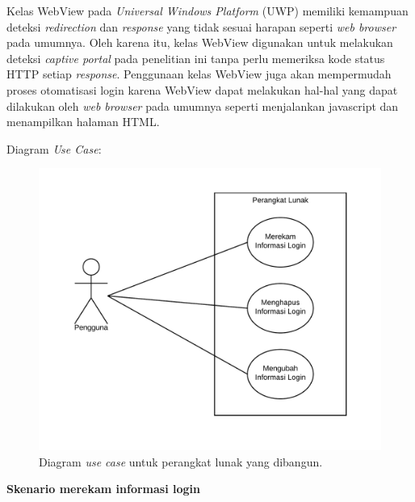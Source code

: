 \documentclass[a4paper,twoside]{article}
\begin{document}
\begin{enumerate}
\begin{itemize}
{                Kelas WebView pada \textit{Universal Windows Platform} (UWP) memiliki kemampuan deteksi \textit{redirection} dan \textit{response} yang tidak sesuai harapan seperti \textit{web browser} pada umumnya. Oleh karena itu, kelas WebView digunakan untuk melakukan deteksi \textit{captive portal} pada penelitian ini tanpa perlu memeriksa kode status HTTP setiap \textit{response}. Penggunaan kelas WebView juga akan mempermudah proses otomatisasi login karena WebView dapat melakukan hal-hal yang dapat dilakukan oleh \textit{web browser} pada umumnya seperti menjalankan javascript dan menampilkan halaman HTML.
            }
        \end{itemize}
        
        \pagebreak
        
        Diagram \textit{Use Case}:
        
        \begin{figure}[h]
            \centering
            \includegraphics[scale=0.77]{usecase.png}
            \caption[Diagram \textit{use case} untuk perangkat lunak yang dibangun.]{Diagram \textit{use case} untuk perangkat lunak yang dibangun.}
            \label{fig:usecase}
        \end{figure}

        \textbf{Skenario merekam informasi login}
        

\end{enumerate}
\end{document}
